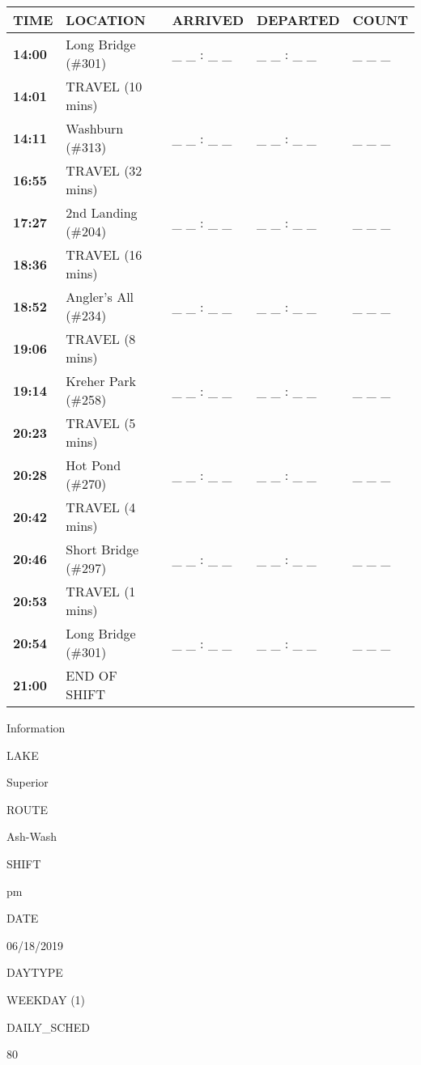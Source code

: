 \documentclass[]{article}
\begin{document}
\begin{tabular}{>{\bfseries}lllll}
\toprule
\textbf{TIME} & \textbf{LOCATION} & \textbf{ARRIVED} & \textbf{DEPARTED} & \textbf{COUNT}\\
\midrule
14:00 & Long Bridge (\#301) & \_ \_ : \_ \_ & \_ \_ : \_ \_ & \_ \_ \_\\
14:01 & TRAVEL (10 mins) &  &  & \\
14:11 & Washburn (\#313) & \_ \_ : \_ \_ & \_ \_ : \_ \_ & \_ \_ \_\\
16:55 & TRAVEL (32 mins) &  &  & \\
17:27 & 2nd Landing (\#204) & \_ \_ : \_ \_ & \_ \_ : \_ \_ & \_ \_ \_\\
18:36 & TRAVEL (16 mins) &  &  & \\
18:52 & Angler's All (\#234) & \_ \_ : \_ \_ & \_ \_ : \_ \_ & \_ \_ \_\\
19:06 & TRAVEL (8 mins) &  &  & \\
19:14 & Kreher Park (\#258) & \_ \_ : \_ \_ & \_ \_ : \_ \_ & \_ \_ \_\\
20:23 & TRAVEL (5 mins) &  &  & \\
20:28 & Hot Pond (\#270) & \_ \_ : \_ \_ & \_ \_ : \_ \_ & \_ \_ \_\\
20:42 & TRAVEL (4 mins) &  &  & \\
20:46 & Short Bridge (\#297) & \_ \_ : \_ \_ & \_ \_ : \_ \_ & \_ \_ \_\\
20:53 & TRAVEL (1 mins) &  &  & \\
20:54 & Long Bridge (\#301) & \_ \_ : \_ \_ & \_ \_ : \_ \_ & \_ \_ \_\\
21:00 & END OF SHIFT &  &  & \\
\bottomrule
\end{tabular}\newpage

Information

LAKE

Superior

ROUTE

Ash-Wash

SHIFT

pm

DATE

06/18/2019

DAYTYPE

WEEKDAY (1)

DAILY\_SCHED

80

\vspace{24pt}
\end{document}
